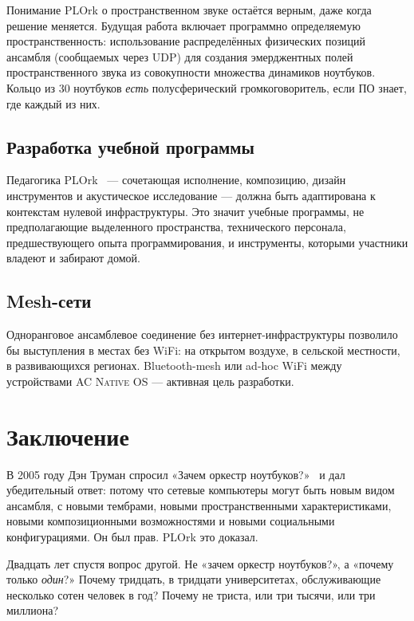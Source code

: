 \documentclass[10pt,letterpaper,twocolumn]{article}
\newcommand{\acos}{\textsc{AC Native OS}}
\begin{document}
Понимание PLOrk о пространственном звуке остаётся верным, даже когда решение меняется. Будущая работа включает программно определяемую пространственность: использование распределённых физических позиций ансамбля (сообщаемых через UDP) для создания эмерджентных полей пространственного звука из совокупности множества динамиков ноутбуков. Кольцо из 30 ноутбуков \emph{есть} полусферический громкоговоритель, если ПО знает, где каждый из них.

\subsection{Разработка учебной программы}

Педагогика PLOrk~\citep{trueman2007why} --- сочетающая исполнение, композицию, дизайн инструментов и акустическое исследование --- должна быть адаптирована к контекстам нулевой инфраструктуры. Это значит учебные программы, не предполагающие выделенного пространства, технического персонала, предшествующего опыта программирования, и инструменты, которыми участники владеют и забирают домой.

\subsection{Mesh-сети}

Одноранговое ансамблевое соединение без интернет-инфраструктуры позволило бы выступления в местах без WiFi: на открытом воздухе, в сельской местности, в развивающихся регионах. Bluetooth-mesh или ad-hoc WiFi между устройствами \acos{} --- активная цель разработки.


\section{Заключение}

В 2005 году Дэн Труман спросил «Зачем оркестр ноутбуков?»~\citep{trueman2007why} и дал убедительный ответ: потому что сетевые компьютеры могут быть новым видом ансамбля, с новыми тембрами, новыми пространственными характеристиками, новыми композиционными возможностями и новыми социальными конфигурациями. Он был прав. PLOrk это доказал.

Двадцать лет спустя вопрос другой. Не «зачем оркестр ноутбуков?», а «почему только \emph{один}?» Почему тридцать, в тридцати университетах, обслуживающие несколько сотен человек в год? Почему не триста, или три тысячи, или три миллиона?
\end{document}
